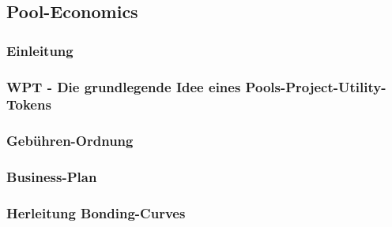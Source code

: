 \subsection{Pool-Economics}
\vspace{0.3cm}


\subsubsection{Einleitung}
\vspace{0.2cm}
\vspace{0.5cm}

\subsubsection{WPT - Die grundlegende Idee eines Pools-Project-Utility-Tokens}
\vspace{0.2cm}

\vspace{0.5cm}

\subsubsection{Gebühren-Ordnung}
\label{sec:fees}
\vspace{0.2cm}
\vspace{0.5cm}

\subsubsection{Business-Plan}
\vspace{0.2cm}
\vspace{0.5cm}

\subsubsection{Herleitung Bonding-Curves}
\vspace{0.2cm}
\vspace{0.5cm}




\newpage



